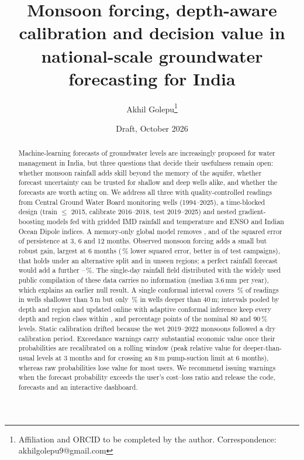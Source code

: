 \documentclass[11pt,a4paper]{article}
\title{Monsoon forcing, depth-aware calibration and decision value in national-scale groundwater forecasting for India}
\author{Akhil Golepu\thanks{Affiliation and ORCID to be completed by the author. Correspondence: akhilgolepu9@gmail.com}}
\date{Draft, October 2026}
\begin{document}
\maketitle

\begin{abstract}
Machine-learning forecasts of groundwater levels are increasingly proposed for water management in India, but three
questions that decide their usefulness remain open: whether monsoon rainfall adds skill beyond the memory of the aquifer,
whether forecast uncertainty can be trusted for shallow and deep wells alike, and whether the forecasts are worth acting on.
We address all three with \nObs{} quality-controlled readings from \nStations{} Central Ground Water Board monitoring wells
(1994--2025), a time-blocked design (train $\le$ 2015, calibrate 2016--2018, test 2019--2025) and nested gradient-boosting
models fed with gridded IMD rainfall and temperature and ENSO and Indian Ocean Dipole indices. A memory-only global model
removes \skillMzeroThree{}, \skillMzeroSix{} and \skillMzeroTwelve{} of the squared error of persistence at 3, 6 and 12
months. Observed monsoon forcing adds a small but robust gain, largest at 6 months (\gainSixMSE\,\% lower squared error, better
in \gainSixWins{} of \gainSixCampaigns{} test campaigns), that holds under an alternative split and in unseen regions; a
perfect rainfall forecast would add a further \oracleMin--\oracleMax\,\%. The single-day rainfall field distributed with
the widely used public compilation of these data carries no information (median 3.6\,mm per year), which explains an earlier
null result. A single conformal interval covers \splitShallow\,\% of readings in wells shallower than 5\,m but only
\splitDeep\,\% in wells deeper than 40\,m; intervals pooled by depth and region and updated online with adaptive conformal
inference keep every depth and region class within \aciWorstThree{}, \aciWorstSix{} and \aciWorstTwelve{} percentage points
of the nominal 80 and 90\,\% levels. Static calibration drifted because the wet 2019--2022 monsoons followed a dry
calibration period. Exceedance warnings carry substantial economic value once their probabilities are recalibrated on a
rolling window (peak relative value \vmaxEoneThree{} for deeper-than-usual levels at 3 months and \vmaxEthreeSix{} for
crossing an 8\,m pump-suction limit at 6 months), whereas raw probabilities lose value for most users. We recommend issuing
warnings when the forecast probability exceeds the user's cost--loss ratio and release the code, forecasts and an interactive
dashboard.
\end{abstract}
\end{document}
